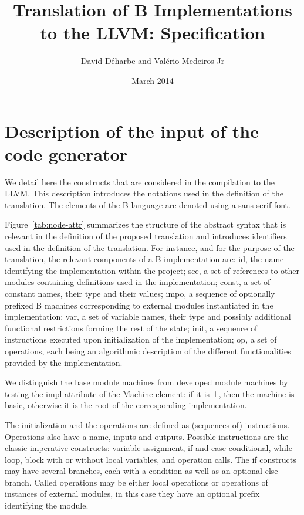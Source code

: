 \documentclass{llncs}
\title{Translation of B Implementations to the LLVM: Specification}
\author{David Déharbe and Valério Medeiros Jr}
\institute{Federal University of Rio Grande do Norte\\
Federal Institute of Education Science and Technology\\
 Natal (Brazil)}
\date{March 2014}
\newcommand{\B}[1]{\textsf{#1}}
\begin{document}
\maketitle

\section{Description of the input of the code generator}
\label{sec:b-ast}

We detail here the constructs that are considered in the compilation to the
LLVM. This description introduces the notations used in the definition of the
translation. The elements of the B language are denoted using a \B{sans serif}
font.

Figure~\ref{tab:node-attr} summarizes the structure
of the abstract syntax that is relevant in the definition of the proposed
translation and introduces identifiers used in the definition of the
translation. For instance, and for the purpose of the translation, the relevant
components of a B implementation are: \B{id}, the name identifying the
implementation within the project; \B{see}, a set of references to other modules
containing definitions used in the implementation; \B{const}, a set of constant
names, their type and their values; \B{impo}, a sequence of optionally
prefixed B machines corresponding to external modules instantiated in the
implementation; \B{var}, a set of variable names, their type and possibly
additional functional restrictions forming the rest of the state; \B{init}, a
sequence of instructions executed upon initialization of the implementation;
\B{op}, a set of operations, each being an algorithmic description of the
different functionalities provided by the implementation.

We distinguish the base module machines from developed module machines by
testing the \B{impl} attribute of the \B{Machine} element: if it is $\bot$, then
the machine is basic, otherwise it is the root of the corresponding
implementation.

The initialization and the operations are defined as (sequences of)
instructions. Operations also have a name, inputs and outputs. Possible
instructions are the classic imperative constructs: variable assignment, if and
case conditional, while loop, block with or without local variables, and
operation calls. The if constructs may have several branches, each with a
condition as well as an optional else branch. Called operations may be either
local operations or operations of instances of external modules, in this case
they have an optional prefix identifying the module.
\end{document}
